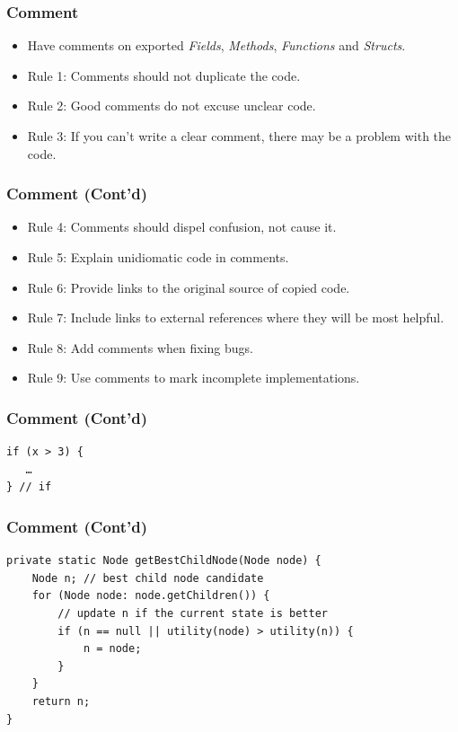 \documentclass{efd-lecture}
\begin{document}
\begin{frame}
  \frametitle{Comment}
  \begin{itemize}
    \item Have comments on exported \textit{\color{YellowOrange}Fields}, \textit{\color{LimeGreen}Methods},
      \textit{\color{Cyan}Functions} and \textit{\color{RubineRed}Structs}.
    \item Rule 1: Comments should not duplicate the code.
    \item Rule 2: Good comments do not excuse unclear code.
    \item Rule 3: If you can’t write a clear comment, there may be a problem with the code.
  \end{itemize}
\end{frame}

\begin{frame}
  \frametitle{Comment (Cont'd)}
  \begin{itemize}
    \item Rule 4: Comments should dispel confusion, not cause it.
    \item Rule 5: Explain unidiomatic code in comments.
    \item Rule 6: Provide links to the original source of copied code.
    \item Rule 7: Include links to external references where they will be most helpful.
    \item Rule 8: Add comments when fixing bugs.
    \item Rule 9: Use comments to mark incomplete implementations.
  \end{itemize}
\end{frame}

\begin{frame}[fragile]
  \frametitle{Comment (Cont'd)}
  \begin{verbatim}
if (x > 3) {
   …
} // if
  \end{verbatim}
\end{frame}

\begin{frame}[fragile]
  \frametitle{Comment (Cont'd)}
  \begin{verbatim}
private static Node getBestChildNode(Node node) {
    Node n; // best child node candidate
    for (Node node: node.getChildren()) {
        // update n if the current state is better
        if (n == null || utility(node) > utility(n)) {
            n = node;
        }
    }
    return n;
}
  \end{verbatim}
\end{frame}
\end{document}
